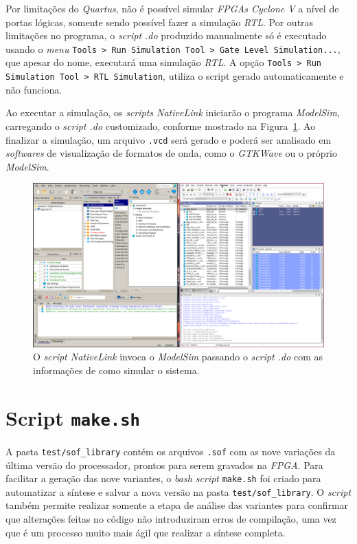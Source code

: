     { Por limitações do \textit{Quartus}, não é possível simular
        \textit{FPGAs Cyclone V} a nível de portas lógicas, somente sendo possível
        fazer a simulação \textit{RTL}. Por outras limitações no programa, o
        \textit{script .do} produzido manualmente só é executado usando o
        \textit{menu} \texttt{Tools > Run Simulation Tool > Gate Level Simulation...},
        que apesar do nome, executará uma simulação \textit{RTL}. A opção
        \texttt{Tools > Run Simulation Tool > RTL Simulation}, utiliza o script
        gerado automaticamente e não funciona.
    }

    { Ao executar a simulação, os \textit{scripts NativeLink} iniciarão o
        programa \textit{ModelSim}, carregando o \textit{script .do} customizado,
        conforme mostrado na Figura~\ref{fig:quartus_modelsim}. Ao finalizar a
        simulação, um arquivo \texttt{.vcd} será gerado e poderá ser analisado
        em \textit{softwares} de visualização de formatos de onda, como o
        \textit{GTKWave} ou o próprio \textit{ModelSim}.
    }
    \begin{figure}[H]
    \centering
        \includegraphics[width=.9\linewidth]{../images/quartus/quartus_modelsim.png}
        \caption{O \textit{script NativeLink} invoca o \textit{ModelSim} passando
            o \textit{script .do} com as informações de como simular o sistema.}
        \label{fig:quartus_modelsim}
    \end{figure}

    \section{Script \texttt{make.sh}}
    { A pasta \texttt{test/sof\_library} contém os arquivos \texttt{.sof} com
        as nove variações da última versão do processador, prontos para serem
        gravados na \textit{FPGA}. Para facilitar a geração das nove variantes,
        o \textit{bash script} \texttt{make.sh} foi criado para automatizar a
        síntese e salvar a nova versão na pasta \texttt{test/sof\_library}.
        O \textit{script} também permite realizar somente a etapa de
        análise das variantes para confirmar que alterações feitas no código não
        introduziram erros de compilação, uma vez que é um processo muito mais
        ágil que realizar a síntese completa.
    }

